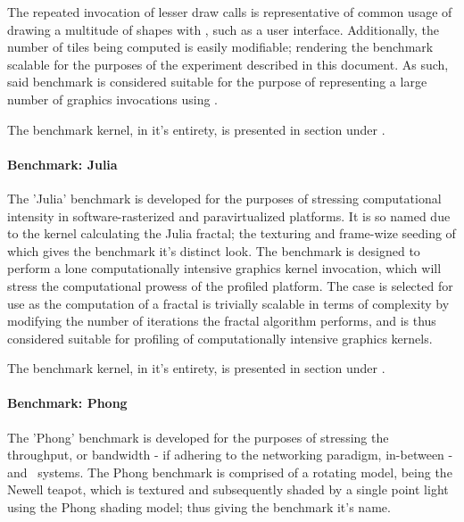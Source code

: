 The repeated invocation of lesser draw calls is representative of common usage of drawing a multitude of shapes with \dvttermopengl , such as a user interface. Additionally, the number of tiles being computed is easily modifiable; rendering the benchmark scalable for the purposes of the experiment described in this document. As such, said benchmark is considered suitable for the purpose of representing a large number of graphics invocations using \dvttermopenglestwopointo .

The benchmark kernel, in it's entirety, is presented in section  under .

\paragraph{Benchmark: Julia}
\label{par:methodologyexperiment_benchmarking_benchmarkjulia}
The 'Julia' benchmark is developed for the purposes of stressing computational intensity in software-rasterized and paravirtualized platforms.
It is so named due to the kernel calculating the Julia fractal; the texturing and frame-wize seeding of which gives the benchmark it's distinct look.
The benchmark is designed to perform a lone computationally intensive graphics kernel invocation, which will stress the computational prowess of the profiled platform.
The case is selected for use as the computation of a fractal is trivially scalable in terms of complexity by modifying the number of iterations the fractal algorithm performs, and is thus considered suitable for profiling of computationally intensive graphics kernels.

The benchmark kernel, in it's entirety, is presented in section
 under .

\paragraph{Benchmark: Phong}
\label{par:methodologyexperiment_benchmarking_benchmarkphong}
The 'Phong' benchmark is developed for the purposes of stressing the throughput, or bandwidth - if adhering to the networking paradigm, in-between \dvttermtarget - and \dvttermhost\ systems.
The Phong benchmark is comprised of a rotating model, being the Newell teapot, which is textured and subsequently shaded by a single point light using the Phong shading model; thus giving the benchmark it's name. %

